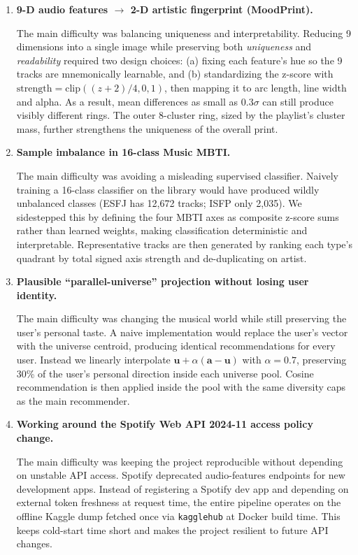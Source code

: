 \documentclass[11pt,a4paper]{article}
\begin{document}
\begin{enumerate}
  \item \textbf{9-D audio features $\to$ 2-D artistic fingerprint
        (MoodPrint).}\par
        The main difficulty was balancing uniqueness and
        interpretability. Reducing 9 dimensions into a single image
        while preserving both \emph{uniqueness} and \emph{readability}
        required two design choices: (a) fixing each feature's hue so
        the 9 tracks are mnemonically learnable, and (b) standardizing
        the z-score with
        $\mathrm{strength}=\mathrm{clip}((z+2)/4,0,1)$, then mapping it
        to arc length, line width and alpha. As a result, mean
        differences as small as $0.3\sigma$ can still produce visibly
        different rings. The outer 8-cluster ring, sized by the
        playlist's cluster mass, further strengthens the uniqueness of
        the overall print.

  \item \textbf{Sample imbalance in 16-class Music MBTI.}\par
        The main difficulty was avoiding a misleading supervised
        classifier. Naively training a 16-class classifier on the
        library would have produced wildly unbalanced classes (ESFJ has
        12{,}672 tracks; ISFP only 2{,}035). We sidestepped this by
        defining the four MBTI axes as composite z-score sums rather
        than learned weights, making classification deterministic and
        interpretable. Representative tracks are then generated by
        ranking each type's quadrant by total signed axis strength and
        de-duplicating on artist.

  \item \textbf{Plausible ``parallel-universe'' projection without
        losing user identity.}\par
        The main difficulty was changing the musical world while still
        preserving the user's personal taste. A naive implementation
        would replace the user's vector with the universe centroid,
        producing identical recommendations for every user. Instead we
        linearly interpolate
        $\mathbf{u} + \alpha (\mathbf{a} - \mathbf{u})$ with
        $\alpha = 0.7$, preserving 30\% of the user's personal
        direction inside each universe pool. Cosine recommendation is
        then applied inside the pool with the same diversity caps as
        the main recommender.

  \item \textbf{Working around the Spotify Web API 2024-11 access
        policy change.}\par
        The main difficulty was keeping the project reproducible
        without depending on unstable API access. Spotify deprecated
        audio-features endpoints for new development apps. Instead of
        registering a Spotify dev app and depending on external token
        freshness at request time, the entire pipeline operates on the
        offline Kaggle dump fetched once via \texttt{kagglehub} at
        Docker build time. This keeps cold-start time short and makes
        the project resilient to future API changes.
\end{enumerate}
\end{document}

